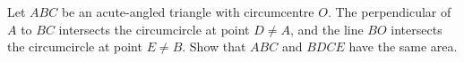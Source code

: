 Let $ABC$ be an acute-angled triangle with circumcentre $O$.
The perpendicular of $A$ to $BC$ intersects the circumcircle at point $D \neq A$,
and the line $BO$ intersects the circumcircle at point $E \neq B$.
Show that $ABC$ and $BDCE$ have the same area.